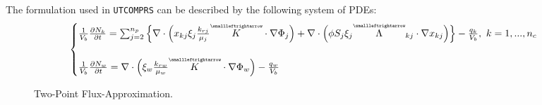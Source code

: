 The formulation used in \texttt{UTCOMPRS} can be described by the following system of PDEs\supercite{phdfernandes}:
\begingroup\makeatletter\def\f@size{12}\check@mathfonts
\begin{equation}
	\begin{cases}
		\frac{1}{V_{b}} \frac{\partial N_{k}}{\partial t} = \sum_{j=2}^{n_{p}}\Big\{\nabla \cdot\Big( x_{kj}\xi_{j}\frac{k_{rj}}{\mu_{j}}\tensor{K}\cdot\nabla\Phi_{j}\Big) + \nabla \cdot \Big(\phi S_{j}\xi_{j}\tensor{\Lambda}_{kj}\cdot\nabla x_{kj}\Big)\Big\} - \frac{q_{k}}{V_{b}}, \ k=1,...,n_{c}\\\\
		\frac{1}{V_{b}} \frac{\partial N_{w}}{\partial t} = \nabla \cdot \Big(\xi_{w}\frac{k_{rw}}{\mu_{w}}\tensor{K}\cdot \nabla\Phi_{w}\Big) - \frac{q_{w}}{V_{b}}
	\end{cases}
\end{equation}\endgroup

\begin{figure}[htb]
\raggedright
\resizebox{13cm}{!}{}
\caption{Two-Point Flux-Approximation.}\label{tpfa}
\end{figure}



